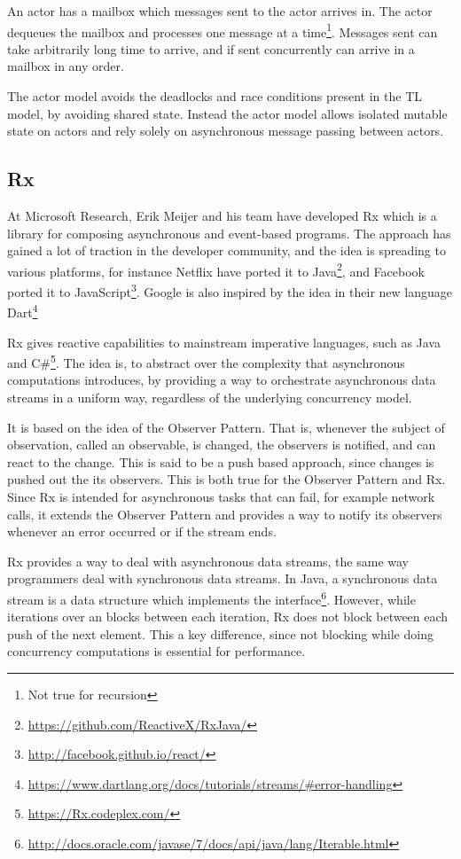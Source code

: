 An actor has a mailbox which messages sent to the actor arrives in. The actor dequeues the mailbox and processes one message at a time\footnote{Not true for recursion}. Messages sent can take arbitrarily long time to arrive, and if sent concurrently can arrive in a mailbox in any order\cite{hewitt2014actor}.

The actor model avoids the deadlocks and race conditions present in the \ac{TL} model, by avoiding shared state\citep[Chap. 32]{odersky2011programming}. Instead the actor model allows isolated mutable state on actors and rely solely on asynchronous message passing between actors.

\subsection{\acl{Rx}}
At Microsoft Research, Erik Meijer and his team have developed \ac{Rx} which is a library for composing asynchronous and event-based programs. The approach has gained a lot of traction in the developer community, and the idea is spreading to various platforms, for instance Netflix have ported it to Java\footnote{\url{https://github.com/ReactiveX/RxJava/}}, and Facebook ported it to JavaScript\footnote{\url{http://facebook.github.io/react/}}. Google is also inspired by the idea in their new language Dart\footnote{\url{https://www.dartlang.org/docs/tutorials/streams/\#error-handling}}

\ac{Rx} gives reactive capabilities to mainstream imperative languages, such as Java and C\#\footnote{\url{https://Rx.codeplex.com/}}. The idea is, to abstract over the complexity that asynchronous computations introduces, by providing a way to orchestrate asynchronous data streams in a uniform way, regardless of the underlying concurrency model.

It is based on the idea of the Observer Pattern\cite{gamma1994design}. That is, whenever the subject of observation, called an observable, is changed, the observers is notified, and can react to the change. This is said to be a push based approach, since changes is pushed out the its observers. This is both true for the Observer Pattern and \ac{Rx}. Since \ac{Rx} is intended for asynchronous tasks that can fail, for example network calls, it extends the Observer Pattern and provides a way to notify its observers whenever an error occurred or if the stream ends.

\ac{Rx} provides a way to deal with asynchronous data streams, the same way programmers deal with synchronous data streams. In Java, a synchronous data stream is a data structure which implements the  interface\footnote{\url{http://docs.oracle.com/javase/7/docs/api/java/lang/Iterable.html}}. However, while iterations over an  blocks between each iteration, \ac{Rx} does not block between each push of the next element. This a key difference, since not blocking while doing concurrency computations is essential for performance.

